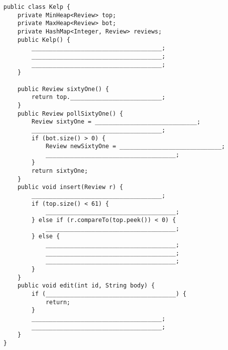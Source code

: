 \pagebreak
\begin{lstlisting}
public class Kelp {
    private MinHeap<Review> top;
    private MaxHeap<Review> bot;
    private HashMap<Integer, Review> reviews;
    public Kelp() {
        _____________________________________;
        _____________________________________;
        _____________________________________;
    }

    public Review sixtyOne() {
        return top.__________________________;
    }
    public Review pollSixtyOne() {
        Review sixtyOne = _____________________________;
        _____________________________________;
        if (bot.size() > 0) {
            Review newSixtyOne = _____________________________;
            _____________________________________;
        }
        return sixtyOne;
    }
    public void insert(Review r) {
        _____________________________________;
        if (top.size() < 61) {
            _____________________________________;
        } else if (r.compareTo(top.peek()) < 0) {
            _____________________________________;
        } else {
            _____________________________________;
            _____________________________________;
            _____________________________________;
        }
    }
    public void edit(int id, String body) {
        if (_____________________________________) {
            return;
        }
        _____________________________________;
        _____________________________________;
    }
}
\end{lstlisting}

